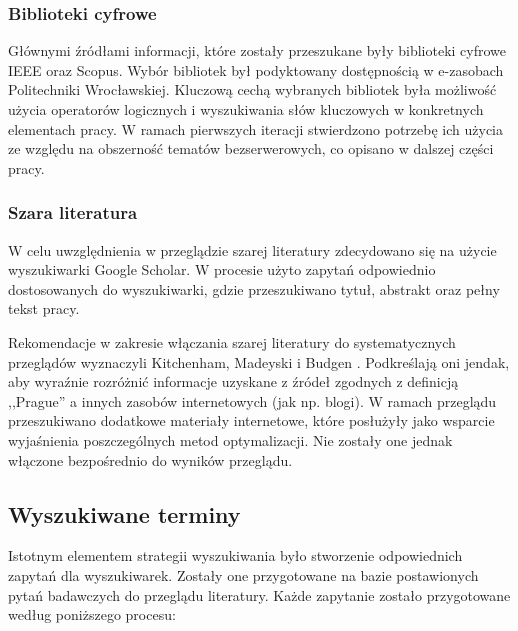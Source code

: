 \subsubsection{Biblioteki cyfrowe}

Głównymi źródłami informacji, które zostały przeszukane były biblioteki cyfrowe IEEE oraz Scopus. 
Wybór bibliotek był podyktowany dostępnością w e-zasobach Politechniki Wrocławskiej. 
Kluczową cechą wybranych bibliotek była możliwość użycia operatorów logicznych i wyszukiwania słów kluczowych w konkretnych elementach pracy.
W ramach pierwszych iteracji stwierdzono potrzebę ich użycia ze względu na obszerność tematów bezserwerowych, co opisano w dalszej części pracy.

\subsubsection{Szara literatura}

W celu uwzględnienia w przeglądzie szarej literatury zdecydowano się na użycie wyszukiwarki Google Scholar.
W procesie użyto zapytań odpowiednio dostosowanych do wyszukiwarki, gdzie przeszukiwano tytuł, abstrakt oraz pełny tekst pracy.

Rekomendacje w zakresie włączania szarej literatury do systematycznych przeglądów wyznaczyli Kitchenham, Madeyski i Budgen \cite{9754223}.
Podkreślają oni jendak, aby wyraźnie rozróżnić informacje uzyskane z źródeł zgodnych z definicją ,,Prague'' a innych zasobów internetowych (jak np. blogi).
W ramach przeglądu przeszukiwano dodatkowe materiały internetowe, które posłużyły jako wsparcie wyjaśnienia poszczególnych metod optymalizacji.
Nie zostały one jednak włączone bezpośrednio do wyników przeglądu.

\subsection{Wyszukiwane terminy}\label{chapter:wyszukiwane_terminy}

Istotnym elementem strategii wyszukiwania było stworzenie odpowiednich zapytań dla wyszukiwarek. 
Zostały one przygotowane na bazie postawionych pytań badawczych do przeglądu literatury.
Każde zapytanie zostało przygotowane według poniższego procesu:


